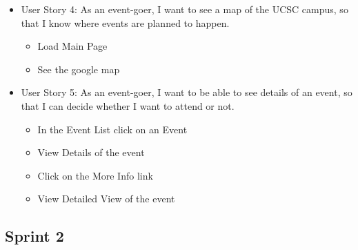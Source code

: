 \documentclass[10pt]{article}
\newcommand{\fancysub}[2] {{\color{primary}\subsection{#1} \label{sec:#2}}}
\begin{document}
\begin{itemize}
			\item User Story 4: As an event-goer, I want to see a map of the UCSC campus, so that I know where events are planned to happen.
			\begin{itemize}
				\item Load Main Page
				\item See the google map
			\end{itemize}

			\item User Story 5: As an event-goer, I want to be able to see details of an event, so that I can decide whether I want to attend or not.
			\begin{itemize}
				\item In the Event List click on an Event
				\item View Details of the event
				\item Click on the More Info link
				\item View Detailed View of the event
			\end{itemize}
		\end{itemize}
	\fancysub{Sprint 2}{sprint2}
    
\end{document}
